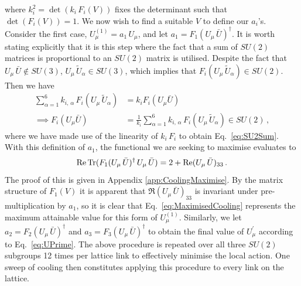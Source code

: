 %
where $k_i^2 = \det(k_i\, F_i(V))$ fixes the determinant such that $\det(F_i(V))=1$.
We now wish to find a suitable $V$ to define our $a_i$'s. Consider the first case, $U^{(1)}_\mu = a_1\,U_\mu$, and let $a_1 = F_1(U_\mu\,\bar{U})^\dagger$. It is worth stating explicitly that it is this step where the fact that a sum of $SU(2)$ matrices is proportional to an $SU(2)$ matrix is utilised. Despite the fact that $U_\mu\,\bar{U} \notin SU(3)$, $U_\mu \, \tilde{U}_\alpha\in SU(3)$, which implies that $F_i(U_\mu\, \tilde{U}_\alpha)\in SU(2)$. Then we have
%
\begin{align}
\sum_{\alpha=1}^6 k_{i,\,\alpha} \, F_i(U_\mu\, \tilde{U}_\alpha) &= k_i F_i(U_\mu \bar{U}) \label{eq:SU2Sum}\\
\implies F_i(U_\mu \bar{U}) &= \frac{1}{k_i}\sum_{\alpha=1}^6 k_{i,\,\alpha} \, F_i(U_\mu\, \tilde{U}_\alpha)\in SU(2)\, ,\nonumber
\end{align}
%
where we have made use of the linearity of $k_i\,F_i$ to obtain Eq.~\ref{eq:SU2Sum}. With this definition of $a_1$, the functional we are seeking to maximise evaluates to
%
\begin{equation}
\operatorname{Re} \operatorname{Tr} (F_1(U_\mu\,\bar{U})^\dagger \, U_\mu \, \bar{U}) = 2 + \operatorname{Re}(U_\mu\, \bar{U})_{33}\, .
\label{eq:MaximisedCooling}
\end{equation}
%
The proof of this is given in Appendix \ref{app:CoolingMaximise}. By the matrix structure of $F_1(V)$ it is apparent that $\Re(U_\mu\, \bar{U})_{33}$ is invariant under pre-multiplication by $a_1$, so it is clear that Eq.~\ref{eq:MaximisedCooling} represents the maximum attainable value for this form of $U^{(1)}_\mu$. Similarly, we let $a_2=F_2(U_\mu\,\bar{U})^\dagger$ and $a_3=F_3(U_\mu\,\bar{U})^\dagger$ to obtain the final value of $U^\prime_\mu$ according to Eq.~\ref{eq:UPrime}. The above procedure is repeated over all three $SU(2)$ subgroups 12 times per lattice link to effectively minimise the local action. One sweep of cooling then constitutes applying this procedure to every link on the lattice.\\

